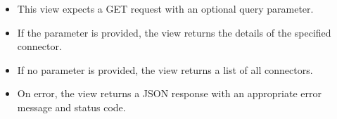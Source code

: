 \documentclass[letterpaper,10pt,english]{sphinxmanual}
\begin{document}
\begin{fulllineitems}
\begin{description}
\begin{sphinxVerbatim}[commandchars=\\\{\}]
\PYG{p}{[}
\PYG{p}{]}
\end{sphinxVerbatim}

\begin{itemize}
\item {} 
\sphinxAtStartPar
This view expects a GET request with an optional  query parameter.

\item {} 
\sphinxAtStartPar
If the  parameter is provided, the view returns the details of the specified connector.

\item {} 
\sphinxAtStartPar
If no  parameter is provided, the view returns a list of all connectors.

\item {} 
\sphinxAtStartPar
On error, the view returns a JSON response with an appropriate error message and status code.

\end{itemize}

\end{description}

\end{fulllineitems}

\end{document}
